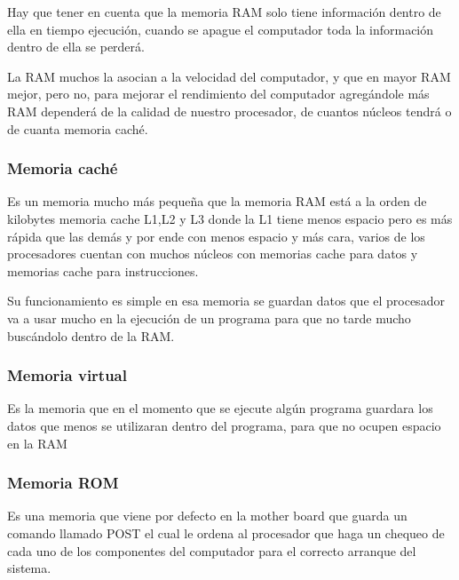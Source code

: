 \documentclass{article}
\begin{document}
Hay que tener en cuenta que la memoria RAM solo tiene información dentro de ella en tiempo ejecución, cuando se apague el computador toda la información dentro de ella se perderá.

La RAM muchos la asocian a la velocidad del computador, y que en mayor RAM mejor, pero no, para mejorar el rendimiento del computador agregándole más RAM dependerá de la calidad de nuestro procesador, de cuantos núcleos tendrá o de cuanta memoria caché.

\subsubsection{Memoria caché}

Es un memoria mucho más pequeña que la memoria RAM está a la orden de kilobytes memoria cache L1,L2 y L3 donde la L1 tiene menos espacio pero es más rápida que las demás y por ende con menos espacio y más cara, varios de los procesadores cuentan con muchos núcleos con memorias cache para datos y memorias cache para instrucciones.

\vspace{10pt}

Su funcionamiento es simple en esa memoria se guardan datos que el procesador va a usar mucho en la ejecución de un programa para que no tarde mucho buscándolo dentro de la RAM.
\subsubsection{Memoria virtual}

Es la memoria que en el momento que se ejecute algún programa guardara los datos que menos se utilizaran dentro del programa, para que no ocupen espacio en la RAM

\subsubsection{Memoria ROM}
Es una memoria  que viene por defecto en la mother board que guarda un comando llamado POST el cual le ordena al procesador que haga un chequeo de cada uno de los componentes del computador para el correcto arranque del sistema.




\end{document}
